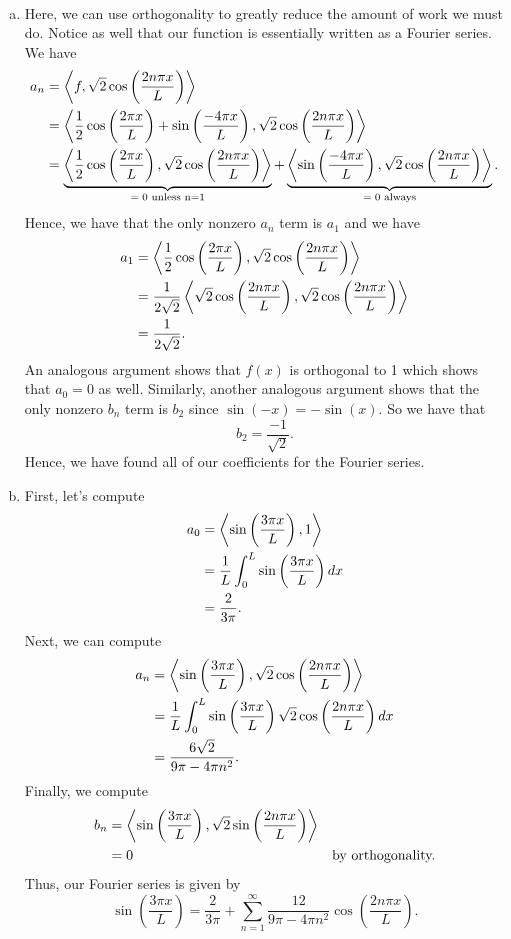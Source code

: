 \documentclass[12pt]{article} %
\begin{document}
\begin{solution}~
	\begin{enumerate}[(a)]
		\item Here, we can use orthogonality to greatly reduce the amount of work we must do.  Notice as well that our function is essentially written as a Fourier series.  We have
		\begin{align*}
		a_n &= \left\langle f, \sqrt{2}\cos\left(\frac{2n\pi x}{L}\right) \right\rangle\\
				&= \left\langle \frac{1}{2}\cos\left(\frac{2\pi x}{L}\right)+\sin\left(\frac{-4\pi x}{L}\right), \sqrt{2}\cos\left(\frac{2n\pi x}{L}\right) \right\rangle\\
				&= \underbrace{\left\langle \frac{1}{2}\cos\left(\frac{2\pi x}{L}\right), \sqrt{2}\cos\left(\frac{2n\pi x}{L}\right) \right\rangle}_{\textrm{$=0$ unless n=1}} +\underbrace{\left\langle \sin\left(\frac{-4\pi x}{L}\right), \sqrt{2}\cos\left(\frac{2n\pi x}{L}\right) \right\rangle}_{\textrm{$=0$ always}}.
		\end{align*}
		Hence, we have that the only nonzero $a_n$ term is $a_1$ and we have
		\begin{align*}
		a_1 &= \left\langle \frac{1}{2}\cos\left(\frac{2\pi x}{L}\right), \sqrt{2}\cos\left(\frac{2n\pi x}{L}\right) \right\rangle\\
		& = \frac{1}{2\sqrt{2}} \left\langle \sqrt{2}\cos\left(\frac{2n\pi x}{L}\right), \sqrt{2}\cos\left(\frac{2n\pi x}{L}\right) \right\rangle\\
		& = \frac{1}{2\sqrt{2}}.
		\end{align*}
		An analogous argument shows that $f(x)$ is orthogonal to 1 which shows that $a_0=0$ as well. Similarly, another analogous argument shows that the only nonzero $b_n$ term is $b_2$ since $\sin(-x)=-\sin(x)$.  So we have that
		\[
		b_2 = \frac{-1}{\sqrt{2}}.
		\]
		Hence, we have found all of our coefficients for the Fourier series.
		
		\item First, let's compute 
		\begin{align*}
			a_0 &= \left\langle \sin\left(\frac{3 \pi x}{L}\right), 1 \right\rangle\\
				&= \frac{1}{L} \int_0^L \sin\left(\frac{3\pi x}{L}\right)dx\\
				&= \frac{2}{3\pi}.
		\end{align*}
		Next, we can compute
		\begin{align*}
					a_n &= \left\langle \sin\left(\frac{3\pi x}{L}\right), \sqrt{2}\cos\left(\frac{2 n \pi x}{L}\right) \right\rangle\\
						&= \frac{1}{L} \int_0^L \sin\left(\frac{3\pi x}{L}\right) \sqrt{2}\cos\left(\frac{2 n \pi x}{L}\right)dx\\
						&=\frac{6 \sqrt{2}}{9\pi-4\pi n^{2}}.
				\end{align*}
		Finally, we compute
		\begin{align*}
			b_n &= \left\langle \sin\left(\frac{3\pi x}{L}\right), \sqrt{2}\sin\left(\frac{2 n \pi x}{L}\right) \right\rangle\\
			&= 0 & \textrm{by orthogonality.}
		\end{align*}	
		Thus, our Fourier series is given by
		\[
			\boxed{\sin\left(\frac{3\pi x}{L}\right) = \frac{2}{3\pi} + \sum_{n=1}^\infty \frac{12}{9\pi - 4\pi n^2} \cos\left(\frac{2n\pi x}{L}\right).}
		\]
		

\end{enumerate}
\end{solution}
\end{document}
